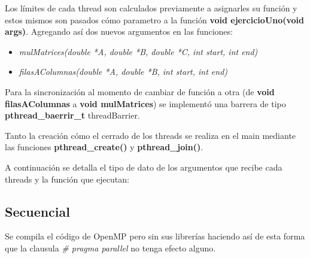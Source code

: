 Los límites de cada thread son calculados previamente a asignarles su función y estos mismos son pasados cómo parametro a la función \textbf{void ejercicioUno(void args)}. Agregando así dos nuevos argumentos en las funciones:
\begin{itemize}
\item \textit{mulMatrices(double *A, double *B, double *C, int start, int end)}
\item \textit{filasAColumnas(double *A, double *B, int start, int end)} 
\end{itemize}
Para la sincronización al momento de cambiar de función a otra (de \textbf{void filasAColumnas} a \textbf{void mulMatrices}) se implementó una barrera de tipo \textbf{pthread\_baerrir\_t} threadBarrier.


Tanto la creación cómo el cerrado de los threads se realiza en el main mediante las funciones \textbf{pthread\_create()} y \textbf{pthread\_join()}.


A continuación se detalla el tipo de dato de los argumentos que recibe cada threads y la función que ejecutan:


\subsection{Secuencial}

Se compila el código de OpenMP pero sin sus librerías haciendo así de esta forma que la clausula \textit{\# pragma parallel} no tenga efecto alguno.
